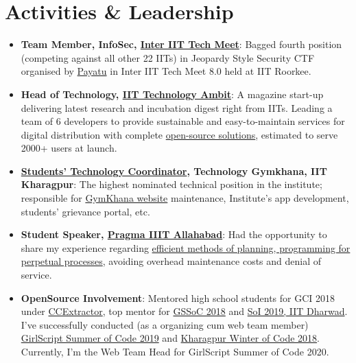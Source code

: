 \documentclass[a4paper,10pt]{extarticle} %
\begin{document}
\vspace{-0.2cm}
\section{\textcolor{primary}{Activities \& Leadership}}

\begin{itemize}[leftmargin=0.55cm, rightmargin=0.2cm, label={\Large\textbullet}]

\item\textbf{Team Member, InfoSec, \href{https://wiki.metakgp.org/w/Inter_IIT_Tech_Meet}{Inter IIT Tech Meet}}: Bagged fourth position (competing against all other 22 IITs) in Jeopardy Style Security CTF organised by \href{https://payatu.com/}{Payatu} in Inter IIT Tech Meet 8.0 held at IIT Roorkee.

\item\textbf{Head of Technology, {\href{https://iit-techambit.in}{IIT Technology Ambit}}}: A magazine start-up delivering latest research and incubation digest right from IITs. Leading a team of 6 developers to provide sustainable and easy-to-maintain services for digital distribution with complete {\href{https://github.com/iit-technology-ambit/}{open-source solutions}}, estimated to serve 2000+ users at launch.

\item \textbf{\href{https://wiki.metakgp.org/w/Constitution_of_the_Technology_Students\%27_Gymkhana#1._TECHNOLOGY_COORDINATOR:}{Students' Technology Coordinator}, Technology Gymkhana, IIT Kharagpur}: The highest nominated technical position in the institute; responsible for \href{http://gymkhana.iitkgp.ac.in/index.php}{GymKhana website} maintenance, Institute's app development, students' grievance portal, etc.

\item \textbf{Student Speaker, \href{http://pragmaconf.tech}{Pragma IIIT Allahabad}}: Had the opportunity to share my experience regarding \href{https://prezi.com/view/tf50MBbGtm9FgPKQfieI/}{efficient methods of planning, programming for perpetual processes}, avoiding overhead maintenance costs and denial of service.

\item \textbf{OpenSource Involvement}: Mentored high school students for GCI 2018 under \href{https://codein.withgoogle.com/organizations/ccextractor-development/}{CCExtractor}, top mentor for \href{https://www.gssoc.tech/}{GSSoC 2018} and \href{https://oss2019.github.io/SoI.html}{SoI 2019, IIT Dharwad}. I've successfully conducted (as a organizing cum web team member) \href{https://gssoc.tech/}{GirlScript Summer of Code 2019} and \href{https://kwoc.kossiitkgp.org/}{Kharagpur Winter of Code 2018}. Currently, I'm the Web Team Head for GirlScript Summer of Code 2020.


\end{itemize}
\end{document}
